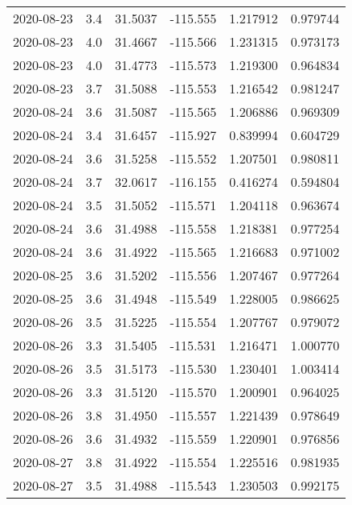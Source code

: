 \begin{tabular}{lrrrrr}
2020-08-23 &       3.4 &  31.5037 &  -115.555 &         1.217912 &         0.979744 \\
2020-08-23 &       4.0 &  31.4667 &  -115.566 &         1.231315 &         0.973173 \\
2020-08-23 &       4.0 &  31.4773 &  -115.573 &         1.219300 &         0.964834 \\
2020-08-23 &       3.7 &  31.5088 &  -115.553 &         1.216542 &         0.981247 \\
2020-08-24 &       3.6 &  31.5087 &  -115.565 &         1.206886 &         0.969309 \\
2020-08-24 &       3.4 &  31.6457 &  -115.927 &         0.839994 &         0.604729 \\
2020-08-24 &       3.6 &  31.5258 &  -115.552 &         1.207501 &         0.980811 \\
2020-08-24 &       3.7 &  32.0617 &  -116.155 &         0.416274 &         0.594804 \\
2020-08-24 &       3.5 &  31.5052 &  -115.571 &         1.204118 &         0.963674 \\
2020-08-24 &       3.6 &  31.4988 &  -115.558 &         1.218381 &         0.977254 \\
2020-08-24 &       3.6 &  31.4922 &  -115.565 &         1.216683 &         0.971002 \\
2020-08-25 &       3.6 &  31.5202 &  -115.556 &         1.207467 &         0.977264 \\
2020-08-25 &       3.6 &  31.4948 &  -115.549 &         1.228005 &         0.986625 \\
2020-08-26 &       3.5 &  31.5225 &  -115.554 &         1.207767 &         0.979072 \\
2020-08-26 &       3.3 &  31.5405 &  -115.531 &         1.216471 &         1.000770 \\
2020-08-26 &       3.5 &  31.5173 &  -115.530 &         1.230401 &         1.003414 \\
2020-08-26 &       3.3 &  31.5120 &  -115.570 &         1.200901 &         0.964025 \\
2020-08-26 &       3.8 &  31.4950 &  -115.557 &         1.221439 &         0.978649 \\
2020-08-26 &       3.6 &  31.4932 &  -115.559 &         1.220901 &         0.976856 \\
2020-08-27 &       3.8 &  31.4922 &  -115.554 &         1.225516 &         0.981935 \\
2020-08-27 &       3.5 &  31.4988 &  -115.543 &         1.230503 &         0.992175 \\

\end{tabular}

